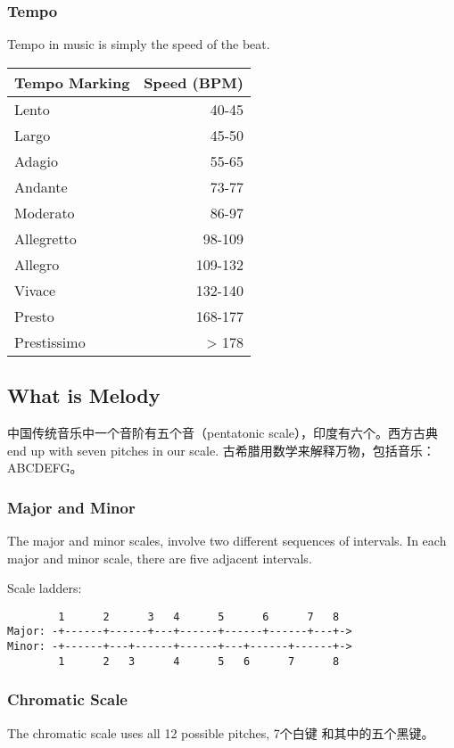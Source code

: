 \subsubsection{Tempo}
Tempo in music is simply the speed of the beat.

\begin{tabular}{l|r}\hline
Tempo Marking & Speed (BPM) \\ \hline
Lento & 40-45 \\ \hline
Largo & 45-50 \\ \hline
Adagio & 55-65 \\ \hline
Andante & 73-77 \\ \hline
Moderato & 86-97 \\ \hline
Allegretto & 98-109 \\ \hline
Allegro & 109-132 \\ \hline
Vivace & 132-140 \\ \hline
Presto & 168-177 \\ \hline
Prestissimo & > 178 \\ \hline
\end{tabular}

\subsection{What is Melody}
中国传统音乐中一个音阶有五个音（pentatonic scale），印度有六个。西方古典 end up
with seven pitches in our scale.
古希腊用数学来解释万物，包括音乐：ABCDEFG。

\subsubsection{Major and Minor}
The major and minor scales, involve two different sequences of
intervals. In each major and minor scale, there are five adjacent
intervals.

Scale ladders:
\begin{lstlisting}
        1      2      3   4      5      6      7   8
Major: -+------+------+---+------+------+------+---+->
Minor: -+------+---+------+------+---+------+------+->
        1      2   3      4      5   6      7      8
\end{lstlisting}

\subsubsection{Chromatic Scale}
The chromatic scale uses all 12 possible pitches, 7个白键
和其中的五个黑键。

